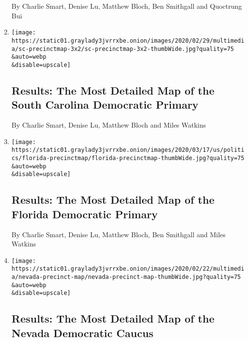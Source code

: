 \begin{enumerate}
  By Charlie Smart, Denise Lu, Matthew Bloch, Ben Smithgall and
  Quoctrung Bui
\item
  \href{/interactive/2020/02/29/us/elections/results-south-carolina-primary-precinct-map.html}{}

  \texttt{[image: https://static01.graylady3jvrrxbe.onion/images/2020/02/29/multimedia/sc-precinctmap-3x2/sc-precinctmap-3x2-thumbWide.jpg?quality=75\\\&auto=webp\\\&disable=upscale]}

  \hypertarget{results-the-most-detailed-map-of-the-south-carolina-democratic-primary}{%
  \subsection{Results: The Most Detailed Map of the South Carolina
  Democratic
  Primary}\label{results-the-most-detailed-map-of-the-south-carolina-democratic-primary}}

  By Charlie Smart, Denise Lu, Matthew Bloch and Miles Watkins
\item
  \href{/interactive/2020/03/17/us/elections/precinct-map-florida-primary.html}{}

  \texttt{[image: https://static01.graylady3jvrrxbe.onion/images/2020/03/17/us/politics/florida-precinctmap/florida-precinctmap-thumbWide.jpg?quality=75\\\&auto=webp\\\&disable=upscale]}

  \hypertarget{results-the-most-detailed-map-of-the-florida-democratic-primary}{%
  \subsection{Results: The Most Detailed Map of the Florida Democratic
  Primary}\label{results-the-most-detailed-map-of-the-florida-democratic-primary}}

  By Charlie Smart, Denise Lu, Matthew Bloch, Ben Smithgall and Miles
  Watkins
\item
  \href{/interactive/2020/02/22/us/elections/results-nevada-caucus-precinct-map.html}{}

  \texttt{[image: https://static01.graylady3jvrrxbe.onion/images/2020/02/22/multimedia/nevada-precinct-map/nevada-precinct-map-thumbWide.jpg?quality=75\\\&auto=webp\\\&disable=upscale]}

  \hypertarget{results-the-most-detailed-map-of-the-nevada-democratic-caucus}{%
  \subsection{Results: The Most Detailed Map of the Nevada Democratic
  Caucus}\label{results-the-most-detailed-map-of-the-nevada-democratic-caucus}}


\end{enumerate}
